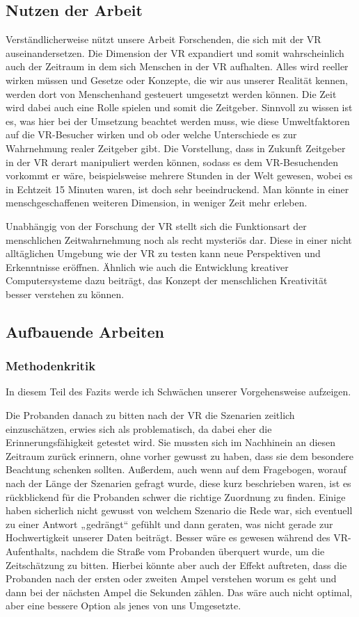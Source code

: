 \documentclass{Bericht}
\begin{document}
\subsection{Nutzen der Arbeit}
Verständlicherweise nützt unsere Arbeit Forschenden, die sich mit der VR auseinandersetzen. Die Dimension der VR expandiert und somit wahrscheinlich auch der Zeitraum in dem sich Menschen in der VR aufhalten. Alles wird reeller wirken müssen und Gesetze oder Konzepte, die wir aus unserer Realität kennen, werden dort von Menschenhand gesteuert umgesetzt werden können. Die Zeit wird dabei auch eine Rolle spielen und somit die Zeitgeber. Sinnvoll zu wissen ist es, was hier bei der Umsetzung beachtet werden muss, wie diese Umweltfaktoren auf die VR-Besucher wirken und ob oder welche Unterschiede es zur Wahrnehmung realer Zeitgeber gibt. Die Vorstellung, dass in Zukunft Zeitgeber in der VR derart manipuliert werden können, sodass es dem VR-Besuchenden vorkommt er wäre, beispielsweise mehrere Stunden in der Welt gewesen, wobei es in Echtzeit 15 Minuten waren, ist doch sehr beeindruckend. Man könnte in einer menschgeschaffenen weiteren Dimension, in weniger Zeit mehr erleben.

Unabhängig von der Forschung der VR stellt sich die Funktionsart der menschlichen Zeitwahrnehmung noch als recht mysteriös dar. Diese in einer nicht alltäglichen Umgebung wie der VR zu testen kann neue Perspektiven und Erkenntnisse eröffnen. Ähnlich wie auch die Entwicklung kreativer Computersysteme dazu beiträgt, das Konzept der menschlichen Kreativität besser verstehen zu können.

\subsection{Aufbauende Arbeiten}
\subsubsection{Methodenkritik}
In diesem Teil des Fazits werde ich Schwächen unserer Vorgehensweise aufzeigen.

Die Probanden danach zu bitten nach der VR die Szenarien zeitlich einzuschätzen, erwies sich als problematisch, da dabei eher die Erinnerungsfähigkeit getestet wird. Sie mussten sich im Nachhinein an diesen Zeitraum zurück erinnern, ohne vorher gewusst zu haben, dass sie dem besondere Beachtung schenken sollten. Außerdem, auch wenn auf dem Fragebogen, worauf nach der Länge der Szenarien gefragt wurde, diese kurz beschrieben waren, ist es rückblickend für die Probanden schwer die richtige Zuordnung zu finden. Einige haben sicherlich nicht gewusst von welchem Szenario die Rede war, sich eventuell zu einer Antwort „gedrängt“ gefühlt und dann geraten, was nicht gerade zur Hochwertigkeit unserer Daten beiträgt. Besser wäre es gewesen während des VR-Aufenthalts, nachdem die Straße vom Probanden überquert wurde, um die Zeitschätzung zu bitten. Hierbei könnte aber auch der Effekt auftreten, dass die Probanden nach der ersten oder zweiten Ampel verstehen worum es geht und dann bei der nächsten Ampel die Sekunden zählen. Das wäre auch nicht optimal, aber eine bessere Option als jenes von uns Umgesetzte.
\end{document}
